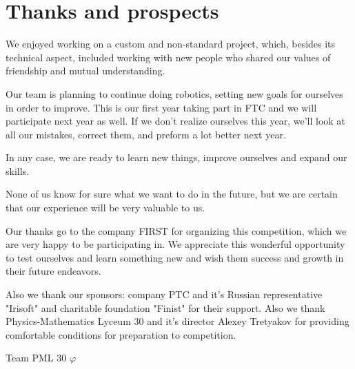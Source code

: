 
\section{Thanks and prospects} 
    We enjoyed working on a custom and non-standard project, which, besides its technical aspect, included working with new people who shared our values of friendship and mutual understanding. 
    
    Our team is planning to continue doing robotics, setting new goals for ourselves in order to improve. This is our first year taking part in FTC and we will participate next year as well. If we don't realize ourselves this year, we'll look at all our mistakes, correct them, and preform a lot better next year.
   
    In any case, we are ready to learn new things, improve ourselves and expand our skills. 
    
    None of us know for sure what we want to do in the future, but we are certain that our experience will be very valuable to us. 
    
    Our thanks go to the company FIRST for organizing this competition, which we are very happy to be participating in. We appreciate this wonderful opportunity to test ourselves and learn something new and wish them success and growth in their future endeavors.
    
    Also we thank our sponsors: company PTC and it's Russian representative "Irisoft" and charitable foundation "Finist" for their support. Also we thank Physics-Mathematics Lyceum 30 and it's director Alexey Tretyakov for providing comfortable conditions for preparation to competition.
   
    
    \begin{center}
      Team PML 30 ${\varphi}$
    \end{center}
    
    \vspace{0.5em}
    
